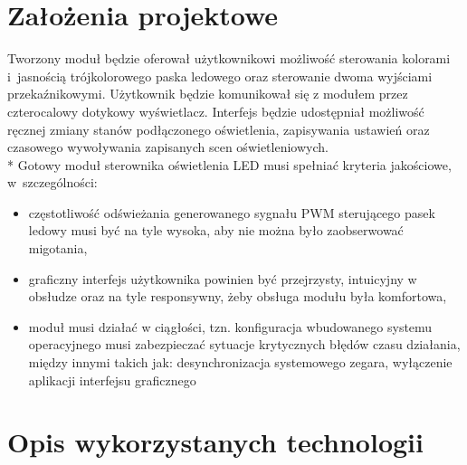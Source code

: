 \documentclass[12pt, eng, twoside, openany, final]{mgr}
\begin{document}
\chapter{Założenia projektowe}
\thispagestyle{fancy}  
    Tworzony moduł będzie oferował użytkownikowi możliwość sterowania kolorami i~jasnością trójkolorowego paska ledowego oraz sterowanie dwoma wyjściami przekaźnikowymi. Użytkownik będzie komunikował się z modułem przez czterocalowy dotykowy wyświetlacz. Interfejs będzie udostępniał możliwość ręcznej zmiany stanów podłączonego oświetlenia, zapisywania ustawień oraz czasowego wywoływania zapisanych scen oświetleniowych.\\*
    Gotowy moduł sterownika oświetlenia LED musi spełniać kryteria jakościowe, w~szczególności:
    \begin{itemize}
        \item częstotliwość odświeżania generowanego sygnału PWM sterującego pasek ledowy musi być na tyle wysoka, aby nie można było zaobserwować migotania,
        
        \item graficzny interfejs użytkownika powinien być przejrzysty, intuicyjny w obsłudze oraz na tyle responsywny, żeby
        obsługa modułu była komfortowa,
        
        \item moduł musi działać w ciągłości, tzn. konfiguracja wbudowanego systemu operacyjnego musi zabezpieczać sytuacje
        krytycznych błędów czasu działania, między innymi takich jak: desynchronizacja systemowego zegara, wyłączenie aplikacji interfejsu graficznego
    \end{itemize}
%
\chapter{Opis wykorzystanych technologii}
\thispagestyle{fancy}
\end{document}
